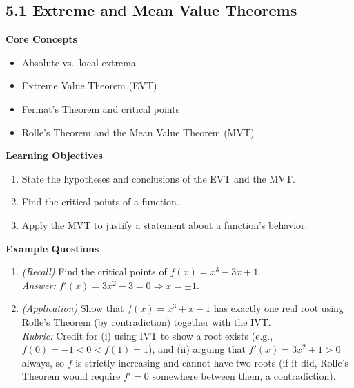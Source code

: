 \documentclass[11pt]{article}
\begin{document}
\subsection{5.1 Extreme and Mean Value Theorems}
\textbf{Core Concepts}
\begin{itemize}
\item Absolute vs.\ local extrema
\item Extreme Value Theorem (EVT)
\item Fermat's Theorem and critical points
\item Rolle's Theorem and the Mean Value Theorem (MVT)
\end{itemize}
\textbf{Learning Objectives}
\begin{enumerate}
\item State the hypotheses and conclusions of the EVT and the MVT.
\item Find the critical points of a function.
\item Apply the MVT to justify a statement about a function's behavior.
\end{enumerate}
\textbf{Example Questions}
\begin{enumerate}
\item \emph{(Recall)} Find the critical points of $f(x) = x^3-3x+1$. \\
\textit{Answer:} $f'(x)=3x^2-3=0 \Rightarrow x=\pm1$.
\item \emph{(Application)} Show that $f(x)=x^3+x-1$ has exactly one real root using Rolle's Theorem (by contradiction) together with the IVT. \\
\textit{Rubric:} Credit for (i) using IVT to show a root exists (e.g., $f(0)=-1<0<f(1)=1$), and (ii) arguing that $f'(x)=3x^2+1>0$ always, so $f$ is strictly increasing and cannot have two roots (if it did, Rolle's Theorem would require $f'=0$ somewhere between them, a contradiction).
\end{enumerate}
\end{document}
